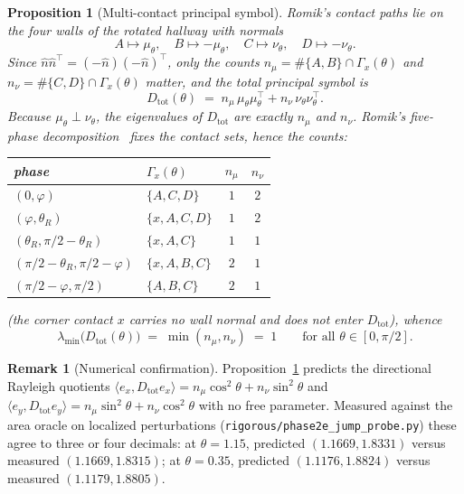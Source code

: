 \documentclass[11pt]{amsart}
\theoremstyle{plain}
\newtheorem{proposition}[theorem]{Proposition}
\theoremstyle{definition}
\newtheorem{remark}[theorem]{Remark}
\begin{document}
\begin{proposition}[Multi-contact principal symbol]\label{prop:multicontact}
Romik's contact paths lie on the four walls of the rotated hallway
with normals
\[
   A \mapsto \mu_{\theta},\quad B\mapsto-\mu_{\theta},\quad
   C \mapsto \nu_{\theta},\quad D\mapsto-\nu_{\theta} .
\]
Since $\hat n\hat n^{\top}=(-\hat n)(-\hat n)^{\top}$, only the counts
$n_{\mu} = \#\{A,B\}\cap\Gamma_{x}(\theta)$ and
$n_{\nu} = \#\{C,D\}\cap\Gamma_{x}(\theta)$ matter, and the total
principal symbol is
\begin{equation}\label{eq:Dtot}
   D_{\mathrm{tot}}(\theta)
   \;=\; n_{\mu}\,\mu_{\theta}\mu_{\theta}^{\top}
       + n_{\nu}\,\nu_{\theta}\nu_{\theta}^{\top} .
\end{equation}
Because $\mu_{\theta}\perp\nu_{\theta}$, the eigenvalues of
$D_{\mathrm{tot}}$ are exactly $n_{\mu}$ and $n_{\nu}$.  Romik's
five-phase decomposition~\cite[\S4]{Romik2018} fixes the contact sets,
hence the counts:
\begin{center}
\begin{tabular}{llcc}
\toprule
phase & $\Gamma_{x}(\theta)$ & $n_{\mu}$ & $n_{\nu}$ \\
\midrule
$(0,\varphi)$                        & $\{A,C,D\}$   & $1$ & $2$ \\
$(\varphi,\theta_{R})$               & $\{x,A,C,D\}$ & $1$ & $2$ \\
$(\theta_{R},\pi/2-\theta_{R})$      & $\{x,A,C\}$   & $1$ & $1$ \\
$(\pi/2-\theta_{R},\pi/2-\varphi)$   & $\{x,A,B,C\}$ & $2$ & $1$ \\
$(\pi/2-\varphi,\pi/2)$              & $\{A,B,C\}$   & $2$ & $1$ \\
\bottomrule
\end{tabular}
\end{center}
(the corner contact $x$ carries no wall normal and does not enter
$D_{\mathrm{tot}}$), whence
\begin{equation}\label{eq:lambda-min-one}
   \lambda_{\min}\bigl(D_{\mathrm{tot}}(\theta)\bigr)
   \;=\;\min(n_{\mu},n_{\nu}) \;=\; 1
   \qquad\text{for all }\theta\in[0,\pi/2].
\end{equation}
\end{proposition}

\begin{remark}[Numerical confirmation]\label{rem:symbol-check}
Proposition~\ref{prop:multicontact} predicts the directional Rayleigh
quotients
$\langle e_{x},D_{\mathrm{tot}}e_{x}\rangle
= n_{\mu}\cos^{2}\theta + n_{\nu}\sin^{2}\theta$ and
$\langle e_{y},D_{\mathrm{tot}}e_{y}\rangle
= n_{\mu}\sin^{2}\theta + n_{\nu}\cos^{2}\theta$
with no free parameter.  Measured against the area oracle on localized
perturbations (\texttt{rigorous/phase2e\_jump\_probe.py}) these agree
to three or four decimals: at $\theta=1.15$, predicted
$(1.1669,1.8331)$ versus measured $(1.1669,1.8315)$; at
$\theta=0.35$, predicted $(1.1176,1.8824)$ versus measured
$(1.1179,1.8805)$.
\end{remark}
\end{document}
